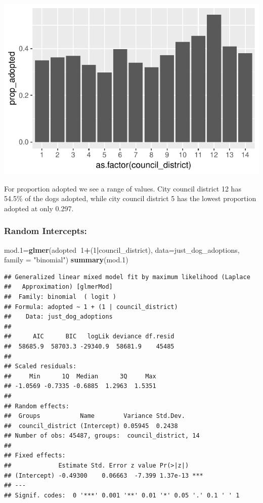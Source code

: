 \documentclass[]{article}
\newenvironment{Shaded}{\begin{snugshade}}{\end{snugshade}}
\newcommand{\KeywordTok}[1]{\textcolor[rgb]{0.13,0.29,0.53}{\textbf{#1}}}
\newcommand{\DataTypeTok}[1]{\textcolor[rgb]{0.13,0.29,0.53}{#1}}
\newcommand{\DecValTok}[1]{\textcolor[rgb]{0.00,0.00,0.81}{#1}}
\newcommand{\StringTok}[1]{\textcolor[rgb]{0.31,0.60,0.02}{#1}}
\newcommand{\OperatorTok}[1]{\textcolor[rgb]{0.81,0.36,0.00}{\textbf{#1}}}
\newcommand{\NormalTok}[1]{#1}
\begin{document}
\includegraphics{Stage_3_files/figure-latex/unnamed-chunk-14-1.pdf}

For proportion adopted we see a range of values. City council district
12 has 54.5\% of the dogs adopted, while city council district 5 has the
lowest proportion adopted at only 0.297.

\subsubsection{Random Intercepts:}\label{random-intercepts}

\begin{Shaded}
\begin{Highlighting}[]
\NormalTok{mod.}\DecValTok{1}\NormalTok{=}\KeywordTok{glmer}\NormalTok{(adopted}\OperatorTok{~}\DecValTok{1}\OperatorTok{+}\NormalTok{(}\DecValTok{1}\OperatorTok{|}\NormalTok{council_district), }\DataTypeTok{data=}\NormalTok{just_dog_adoptions, }\DataTypeTok{family =} \StringTok{"binomial"}\NormalTok{)}
\KeywordTok{summary}\NormalTok{(mod.}\DecValTok{1}\NormalTok{)}
\end{Highlighting}
\end{Shaded}

\begin{verbatim}
## Generalized linear mixed model fit by maximum likelihood (Laplace
##   Approximation) [glmerMod]
##  Family: binomial  ( logit )
## Formula: adopted ~ 1 + (1 | council_district)
##    Data: just_dog_adoptions
## 
##      AIC      BIC   logLik deviance df.resid 
##  58685.9  58703.3 -29340.9  58681.9    45485 
## 
## Scaled residuals: 
##     Min      1Q  Median      3Q     Max 
## -1.0569 -0.7335 -0.6885  1.2963  1.5351 
## 
## Random effects:
##  Groups           Name        Variance Std.Dev.
##  council_district (Intercept) 0.05945  0.2438  
## Number of obs: 45487, groups:  council_district, 14
## 
## Fixed effects:
##             Estimate Std. Error z value Pr(>|z|)    
## (Intercept) -0.49300    0.06663  -7.399 1.37e-13 ***
## ---
## Signif. codes:  0 '***' 0.001 '**' 0.01 '*' 0.05 '.' 0.1 ' ' 1
\end{verbatim}
\end{document}
